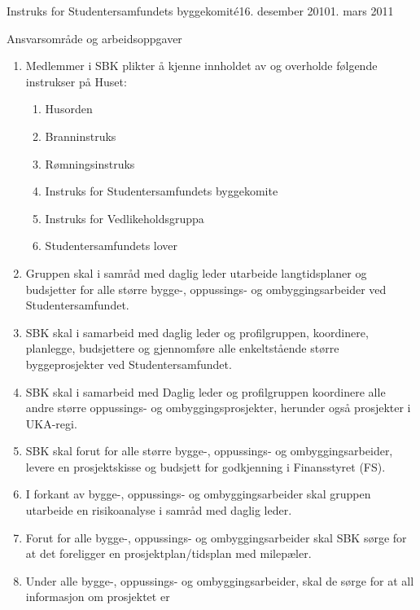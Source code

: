 \begin{instruks}{Instruks for Studentersamfundets byggekomité}{16. desember 2010}{1. mars 2011}
    \begin{instruksledd}{ Ansvarsområde og arbeidsoppgaver}
        \begin{enumerate}
            \item Medlemmer i SBK plikter å kjenne innholdet av og overholde følgende instrukser på
                Huset:
                \begin{enumerate}
                    \item Husorden
                    \item Branninstruks
                    \item Rømningsinstruks
                    \item Instruks for Studentersamfundets byggekomite
                    \item Instruks for Vedlikeholdsgruppa
                    \item Studentersamfundets lover
                \end{enumerate}
            \item Gruppen skal i samråd med daglig leder utarbeide langtidsplaner og
                budsjetter for alle større bygge-,
                oppussings- og ombyggingsarbeider ved Studentersamfundet.
            \item SBK skal i samarbeid med daglig leder og profilgruppen, koordinere,
                planlegge, budsjettere og gjennomføre
                alle enkeltstående større byggeprosjekter ved Studentersamfundet.
            \item SBK skal i samarbeid med Daglig leder og profilgruppen koordinere alle
                andre større oppussings- og
                ombyggingsprosjekter, herunder også prosjekter i UKA-regi.
            \item SBK skal forut for alle større bygge-, oppussings- og
                ombyggingsarbeider, levere en prosjektskisse og
                budsjett for godkjenning i Finansstyret (FS).
            \item I forkant av bygge-, oppussings- og ombyggingsarbeider skal gruppen
                utarbeide en risikoanalyse i samråd
                med daglig leder.
            \item  Forut for alle bygge-, oppussings- og ombyggingsarbeider skal SBK sørge
                for at det foreligger en
                prosjektplan/tidsplan med milepæler.
            \item Under alle bygge-, oppussings- og ombyggingsarbeider, skal de sørge for
                at all informasjon om prosjektet er

\end{enumerate}
\end{instruksledd}
\end{instruks}
